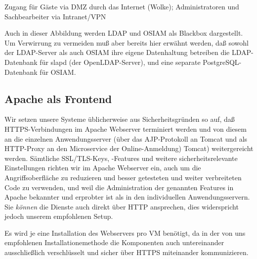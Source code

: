 \begin{minipage}{\linewidth}

{\footnotesize Zugang für Gäste via DMZ durch das Internet (Wolke);
 Administratoren und Sachbearbeiter via Intranet/VPN}

\end{minipage}

Auch in dieser Abbildung werden LDAP und OSIAM als Blackbox
dargestellt. Um Verwirrung zu vermeiden muß aber bereits hier
erwähnt werden, daß sowohl der LDAP-Server als auch OSIAM ihre
eigene Datenhaltung betreiben \dash die LDAP-Datenbank für slapd
(der OpenLDAP-Server), und eine separate PostgreSQL-Datenbank
für OSIAM.

\fi%

\subsection{Apache als Frontend}\label{subsec:intro-apache}

Wir setzen unsere Systeme üblicherweise aus Sicherheitsgründen so auf,
daß HTTPS-Verbindungen im Apache Webserver terminiert werden und von
diesem an die einzelnen Anwendungsserver (über das AJP-Protokoll an
\ifoa
Tomcat und als HTTP-Proxy an den Microservice der Online-Anmeldung)
\else%
Tomcat)
\fi%
weitergereicht werden. Sämtliche SSL/TLS-Keys, -Features und weitere
sicherheitsrelevante Einstellungen richten wir im Apache Webserver ein,
auch um die Angriffsoberfläche zu reduzieren und besser getesteten und
weiter verbreiteten Code zu verwenden, und weil die Administration der
genannten Features in Apache bekannter und erprobter ist als in den
individuellen Anwendungsservern. Sie \emph{können} die Dienste auch direkt
über HTTP ansprechen, dies widerspricht jedoch unserem empfohlenen Setup.

\ifoa
Es wird je eine Installation des Webservers pro VM benötigt, da in
der von uns empfohlenen Installationemethode die Komponenten auch
untereinander ausschließlich verschlüsselt und sicher über HTTPS
miteinander kommunizieren.
\fi%

